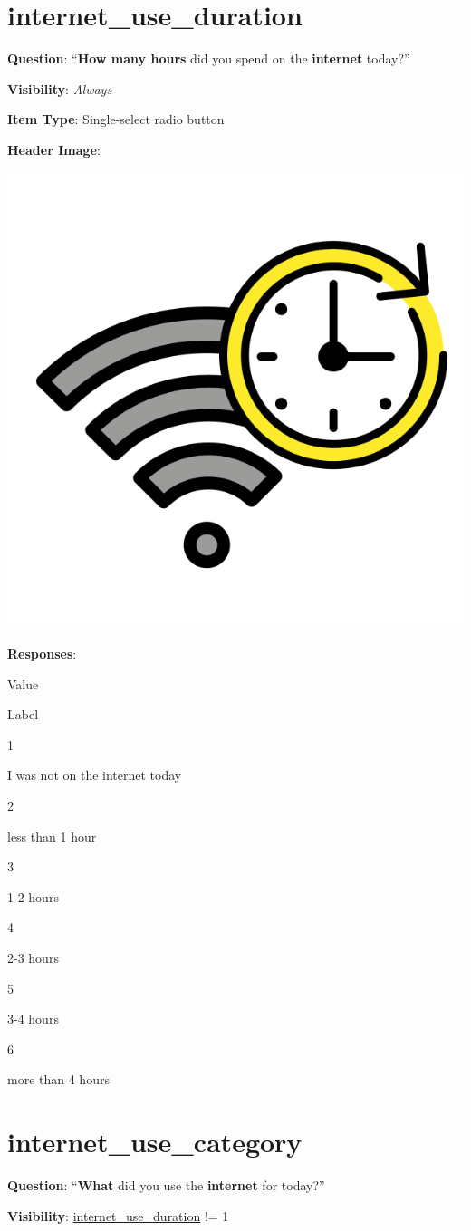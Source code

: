 \documentclass[]{book}
\begin{document}
\hypertarget{internet_use_duration}{%
\section{internet\_use\_duration}\label{internet_use_duration}}

\textbf{Question}: ``\textbf{How many hours} did you spend on the \textbf{internet} today?''

\textbf{Visibility}: \emph{Always}

\textbf{Item Type}: Single-select radio button

\textbf{Header Image}:

\begin{flushleft}\includegraphics[width=0.33\linewidth]{downloadFigs4latex_NIMH_Applet_Codebook/internet_use_duration_headerImg} \end{flushleft}

\textbf{Responses}:

Value

Label

1

I was not on the internet today

2

less than 1 hour

3

1-2 hours

4

2-3 hours

5

3-4 hours

6

more than 4 hours

\hypertarget{internet_use_category}{%
\section{internet\_use\_category}\label{internet_use_category}}

\textbf{Question}: ``\textbf{What} did you use the \textbf{internet} for today?''

\textbf{Visibility}: \protect\hyperlink{internet_use_duration}{internet\_use\_duration} != 1
\end{document}
